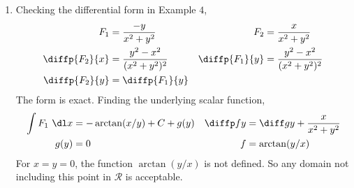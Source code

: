 \begin{enumerate}
    \item Checking the differential form in Example $ 4 $,
          \begin{align}
              F_1             & = \frac{-y}{x^2 + y^2}            &
              F_2             & = \frac{x}{x^2 + y^2}               \\
              \diffp {F_2}{x} & = \frac{y^2 - x^2}{(x^2 + y^2)^2} &
              \diffp {F_1}{y} & = \frac{y^2 - x^2}{(x^2 + y^2)^2}   \\
              \diffp {F_2}{y} & = \diffp {F_1}{y}
          \end{align}
          The form is exact. Finding the underlying scalar function,
          \begin{align}
              \int F_1 \ \dl x & = -\arctan(x/y) + C + g(y)       &
              \diffp fy        & = \diff gy + \frac{x}{x^2 + y^2}   \\
              g(y)             & = 0                              &
              f                & = \arctan(y/x)
          \end{align}
          For $ x = y = 0 $, the function $ \arctan(y/x) $ is not defined. So any
          domain not including this point in $ \mathcal{R} $ is acceptable.


\end{enumerate}
